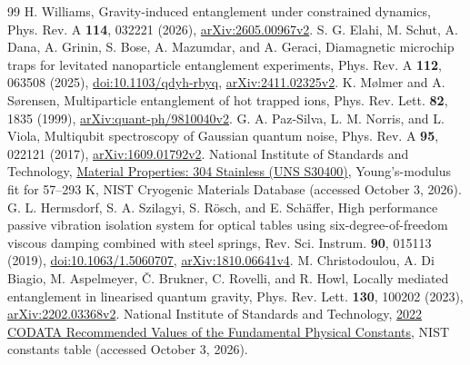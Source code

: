 \documentclass[aps,pra,reprint,amsmath,amssymb,longbibliography,floatfix]{revtex4-2}
\begin{document}
\begin{thebibliography}{99}
 H. Williams, Gravity-induced entanglement under constrained dynamics, Phys. Rev. A \textbf{114}, 032221 (2026), \href{https://arxiv.org/abs/2605.00967v2}{arXiv:2605.00967v2}.
 S. G. Elahi, M. Schut, A. Dana, A. Grinin, S. Bose, A. Mazumdar, and A. Geraci, Diamagnetic microchip traps for levitated nanoparticle entanglement experiments, Phys. Rev. A \textbf{112}, 063508 (2025), \href{https://doi.org/10.1103/qdyh-rbyq}{doi:10.1103/qdyh-rbyq}, \href{https://arxiv.org/abs/2411.02325v2}{arXiv:2411.02325v2}.
 K. M\o lmer and A. S\o rensen, Multiparticle entanglement of hot trapped ions, Phys. Rev. Lett. \textbf{82}, 1835 (1999), \href{https://arxiv.org/abs/quant-ph/9810040v2}{arXiv:quant-ph/9810040v2}.
 G. A. Paz-Silva, L. M. Norris, and L. Viola, Multiqubit spectroscopy of Gaussian quantum noise, Phys. Rev. A \textbf{95}, 022121 (2017), \href{https://arxiv.org/abs/1609.01792v2}{arXiv:1609.01792v2}.
 National Institute of Standards and Technology, \href{https://trc.nist.gov/cryogenics/materials/304Stainless/304Stainless_rev.htm}{Material Properties: 304 Stainless (UNS S30400)}, Young's-modulus fit for 57--293 K, NIST Cryogenic Materials Database (accessed October 3, 2026).
 G. L. Hermsdorf, S. A. Szilagyi, S. R\"osch, and E. Sch\"affer, High performance passive vibration isolation system for optical tables using six-degree-of-freedom viscous damping combined with steel springs, Rev. Sci. Instrum. \textbf{90}, 015113 (2019), \href{https://doi.org/10.1063/1.5060707}{doi:10.1063/1.5060707}, \href{https://arxiv.org/abs/1810.06641v4}{arXiv:1810.06641v4}.
 M. Christodoulou, A. Di Biagio, M. Aspelmeyer, \v{C}. Brukner, C. Rovelli, and R. Howl, Locally mediated entanglement in linearised quantum gravity, Phys. Rev. Lett. \textbf{130}, 100202 (2023), \href{https://arxiv.org/abs/2202.03368v2}{arXiv:2202.03368v2}.
 National Institute of Standards and Technology, \href{https://physics.nist.gov/cuu/Constants/Table/allascii.txt}{2022 CODATA Recommended Values of the Fundamental Physical Constants}, NIST constants table (accessed October 3, 2026).
\end{thebibliography}
\end{document}
